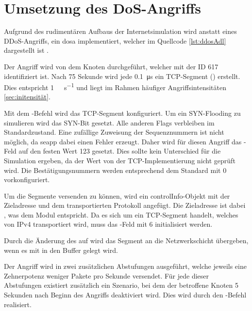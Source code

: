 \section{Umsetzung des DoS-Angriffs}
\begin{program}[ht]
	}]{tucsnet/attacks/ddosLarge.adl}
	\caption{Angriffsdefinition für den großen DoS-Angriff} 
	\label{lst:ddosAdl}
\end{program}
Aufgrund des rudimentären Aufbaus der Internetsimulation wird anstatt eines DDoS-Angriffs, ein \gls{dosa} implementiert, welcher im Quellcode \ref{lst:ddosAdl} dargestellt ist . 

Der Angriff wird von dem Knoten  durchgeführt, welcher mit der ID 617 identifiziert ist. Nach 75 Sekunde wird jede \SI{0.1}{\micro\second} ein TCP-Segment () erstellt. Dies entspricht  \SI{1}{\mega\packets\per\second} und liegt im Rahmen häufiger Angriffsintensitäten \ref{sec:initensität}. 

Mit dem -Befehl wird das TCP-Segment konfiguriert. Um ein SYN-Flooding zu simulieren wird das SYN-Bit gesetzt. Alle anderen Flags verbleiben im Standardzustand. Eine zufällige Zuweisung der Sequenznummern ist nicht möglich, da \gls{seapp} dabei einen Fehler erzeugt. Daher wird für diesen Angriff das -Feld auf den festen Wert 123 gesetzt. Dies sollte kein Unterschied für die Simulation ergeben, da der Wert von der TCP-Implementierung nicht geprüft wird. Die Bestätigungsnummern werden entsprechend dem Standard mit 0 vorkonfiguriert.

Um die Segmente versenden zu können, wird ein controlInfo-Objekt mit der Zieladresse und dem transportierten Protokoll angefügt. Die Zieladresse ist dabei , was dem Modul  entspricht. Da es sich um ein TCP-Segment handelt, welches von IPv4 transportiert wird, muss das -Feld mit $6$ initialisiert \cite{RFC1700,RFC3232} werden. 

Durch die Änderung des  auf  wird das Segment an die Netzwerkschicht übergeben, wenn es mit  in den Buffer gelegt wird.

Der Angriff wird in zwei zusätzlichen Abstufungen ausgeführt, welche jeweils eine Zehnerpotenz weniger Pakete pro Sekunde versendet. Für jede dieser Abstufungen existiert zusätzlich ein Szenario, bei dem der betroffene Knoten 5 Sekunden nach Beginn des Angriffs deaktiviert wird. Dies wird durch den -Befehl realisiert.

